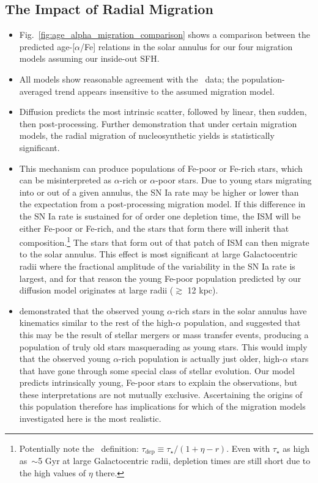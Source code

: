 \documentclass[a4paper, fleqn, usenatbib, useAMS]{mnras}
\begin{document}
\subsection{The Impact of Radial Migration} 
\label{sec:age_alpha:migration} 
\begin{itemize} 
	\item Fig.~\ref{fig:age_alpha_migration_comparison} shows a comparison 
	between the predicted age-[$\alpha$/Fe] relations in the solar annulus for 
	our four migration models assuming our inside-out SFH. 

	\item All models show reasonable agreement with the~\citet{Feuillet2019} 
	data; the population-averaged trend appears insensitive to the assumed 
	migration model. 

	\item Diffusion predicts the most intrinsic scatter, followed by linear, 
	then sudden, then post-processing. Further demonstration that under 
	certain migration models, the radial migration of nucleosynthetic yields 
	is statistically significant. 

	\item This mechanism can produce populations of Fe-poor or Fe-rich stars, 
	which can be misinterpreted as $\alpha$-rich or $\alpha$-poor stars. Due 
	to young stars migrating into or out of a given annulus, the SN Ia rate 
	may be higher or lower than the expectation from a post-processing 
	migration model. If this difference in the SN Ia rate is sustained for of 
	order one depletion time, the ISM will be either Fe-poor or Fe-rich, and 
	the stars that form there will inherit that composition.\footnote{
		{\color{red} Potentially note the~\citet{Weinberg2017} definition: 
		$\tau_\text{dep} \equiv \tau_\star/(1 + \eta - r)$. Even with 
		$\tau_\star$ as high as~$\sim$5 Gyr at large Galactocentric radii, 
		depletion times are still short due to the high values of $\eta$ 
		there.}
	} The stars that form out of that patch of ISM can then migrate to the 
	solar annulus. This effect is most significant at large Galactocentric 
	radii where the fractional amplitude of the variability in the SN Ia rate 
	is largest, and for that reason the young Fe-poor population predicted by 
	our diffusion model originates at large radii ($\gtrsim$ 12 kpc). 

	\item \citet{SilvaAguirre2018} demonstrated that the observed young 
	$\alpha$-rich stars in the solar annulus have kinematics similar to the 
	rest of the high-$\alpha$ population, and suggested that this may be the 
	result of stellar mergers or mass transfer events, producing a population 
	of truly old stars masquerading as young stars. This would imply that the 
	observed young $\alpha$-rich population is actually just older, 
	high-$\alpha$ stars that have gone through some special class of stellar 
	evolution. Our model predicts intrinsically young, Fe-poor stars to 
	explain the observations, but these interpretations are not mutually 
	exclusive. Ascertaining the origins of this population therefore has 
	implications for which of the migration models investigated here is the 
	most realistic. 
\end{itemize} 
\end{document}
